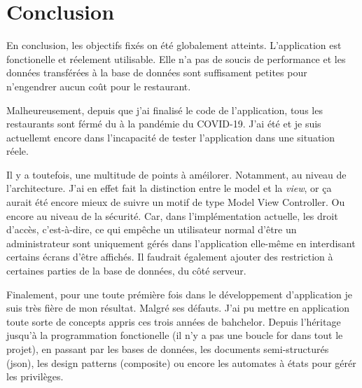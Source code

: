 
\chapter{Conclusion}
En conclusion, les objectifs fixés on été globalement atteints. L'application est fonctionelle et réelement utilisable. Elle n'a pas de soucis de performance et les données transférées à la base de données sont suffisament petites pour n'engendrer aucun coût pour le restaurant. 

Malheureusement, depuis que j'ai finalisé le code de l'application, tous les restaurants sont férmé du à la pandémie du COVID-19. J'ai été et je suis actuellemt encore dans l'incapacité de tester l'application dans une situation réele. 

Il y a toutefois, une multitude de points à améilorer. Notamment, au niveau de l'architecture. J'ai en effet fait la distinction entre le model et la \textit{view}, or ça aurait été encore mieux de suivre un motif de type Model View Controller. 
Ou encore au niveau de la sécurité. Car, dans l'implémentation actuelle, les droit d'accès, c'est-à-dire, ce qui empêche un utilisateur normal d'être un administrateur sont uniquement gérés dans l'application elle-même en interdisant certains écrans d'être affichés. Il faudrait également ajouter des restriction à certaines parties de la base de données, du côté serveur.

Finalement, pour une toute prémière fois dans le développement d'application je suis très fière de mon résultat.  Malgré ses défauts. J'ai pu mettre en application toute sorte de concepts appris ces trois années de bahchelor. Depuis l'héritage jusqu'à la programmation fonctionelle (il n'y a pas une boucle for dans tout le projet), en passant par les bases de données, les documents semi-structurés (json), les design patterns (composite) ou encore les automates à états pour gérér les privilèges. 